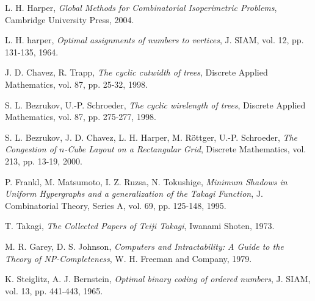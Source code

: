\documentclass[12pt]{ucthesis}
\theoremstyle{plain}
\theoremstyle{definition}
\begin{document}
\begin{thebibliography}{9}

	L. H. Harper,
	\emph{Global Methods for Combinatorial Isoperimetric Problems},
	Cambridge University Press, 2004.

	L. H. harper,
	\emph{Optimal assignments of numbers to vertices},
	J. SIAM, vol. 12, pp. 131-135, 1964.

	J. D. Chavez, R. Trapp,
	\emph{The cyclic cutwidth of trees},
	Discrete Applied Mathematics, vol. 87, pp. 25-32, 1998.

	S. L. Bezrukov, U.-P. Schroeder,
	\emph{The cyclic wirelength of trees},
	Discrete Applied Mathematics, vol. 87, pp. 275-277, 1998.

	S. L. Bezrukov, J. D. Chavez, L. H. Harper, M. Röttger, U.-P. Schroeder,
	\emph{The Congestion of $n$-Cube Layout on a Rectangular Grid},
	Discrete Mathematics, vol. 213, pp. 13-19, 2000.

	P. Frankl, M. Matsumoto, I. Z. Ruzsa, N. Tokushige,
	\emph{Minimum Shadows in Uniform Hypergraphs and a generalization of the Takagi Function},
	J. Combinatorial Theory, Series A, vol. 69, pp. 125-148, 1995.

	T. Takagi,
	\emph{The Collected Papers of Teiji Takagi},
	Iwanami Shoten, 1973.

	M. R. Garey, D. S. Johnson,
	\emph{Computers and Intractability: A Guide to the Theory of NP-Completeness},
	W. H. Freeman and Company, 1979.

	K. Steiglitz, A. J. Bernstein,
	\emph{Optimal binary coding of ordered numbers},
	J. SIAM, vol. 13, pp. 441-443, 1965.

\end{thebibliography}
\end{document}
